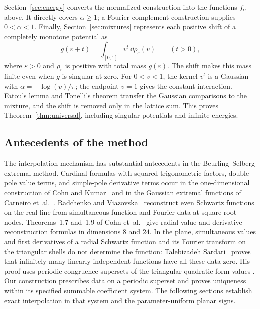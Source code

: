 Section~\ref{sec:energy} converts the normalized construction into the
functions $f_\alpha$ above.  It directly covers $\alpha\ge1$; a
Fourier-complement construction supplies $0<\alpha<1$.
Finally, Section~\ref{sec:mixtures} represents each positive shift of a
completely monotone potential as
\[
 g(\varepsilon+t)=\int_{[0,1]}v^t\,\dd\rho_\varepsilon(v)
 \qquad(t>0),
\]
where $\varepsilon>0$ and $\rho_\varepsilon$ is positive with total mass
$g(\varepsilon)$.  The shift makes this mass finite even when $g$ is
singular at zero.  For $0<v<1$, the kernel $v^t$ is a Gaussian with
$\alpha=-\log(v)/\pi$; the endpoint $v=1$ gives the constant interaction.
Fatou's lemma and Tonelli's theorem transfer the Gaussian comparisons to
the mixture, and the shift is removed only in the lattice sum.  This proves
Theorem~\ref{thm:universal}, including singular potentials and infinite
energies.

\subsection{Antecedents of the method}

The interpolation mechanism has substantial antecedents in the
Beurling--Selberg extremal method.  Cardinal formulas with squared
trigonometric factors, double-pole value terms, and simple-pole derivative
terms occur in the one-dimensional construction of Cohn and Kumar~\citep[Proposition~9.6]{CohnKumar2007} and in the Gaussian
extremal functions of Carneiro et~al.~\citep[Section~1, (1.2)--(1.3)]{CarneiroLittmannVaaler2013}.
Radchenko and Viazovska~\citep[Theorem~1]{RadchenkoViazovska2019} reconstruct even Schwartz functions
on the real line from simultaneous function and Fourier data at square-root
nodes.  Theorems~1.7 and~1.9 of Cohn et~al.~\citep{CKMRV2022} give radial
value-and-derivative reconstruction formulas in dimensions $8$ and $24$.
In the plane, simultaneous values and first derivatives of a radial
Schwartz function and its Fourier transform on the triangular shells do
not determine the function: Talebizadeh Sardari~\citep[Theorem~1.7]{Sardari2021} proves that
infinitely many linearly independent functions have all these data zero.
His proof uses periodic congruence supersets of the triangular
quadratic-form values \citep[Section~6.1, Lemma~6.1]{Sardari2021}.
Our construction prescribes data on a periodic superset and proves
uniqueness within its specified summable coefficient system.  The following
sections establish exact interpolation in that system and the
parameter-uniform planar signs.

